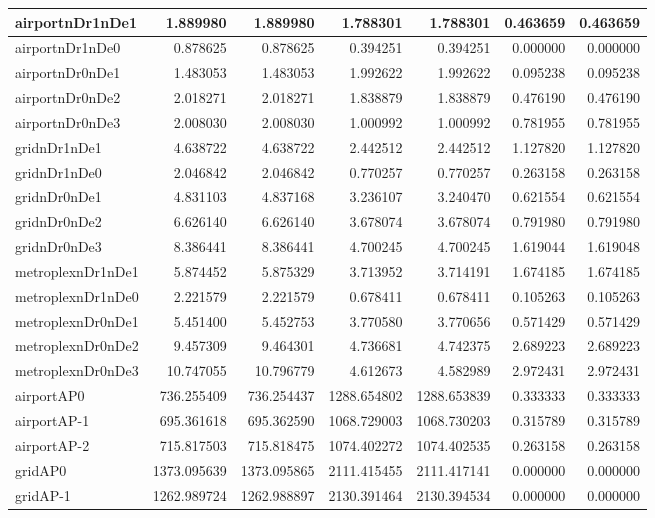 \begin{longtable}{|l|r|r|r|r|r|r|}
\endlastfoot
airportnDr1nDe1 & 1.889980 & 1.889980 & 1.788301 & 1.788301 & 0.463659 & 0.463659 \\ \hline
airportnDr1nDe0 & 0.878625 & 0.878625 & 0.394251 & 0.394251 & 0.000000 & 0.000000 \\ \hline
airportnDr0nDe1 & 1.483053 & 1.483053 & 1.992622 & 1.992622 & 0.095238 & 0.095238 \\ \hline
airportnDr0nDe2 & 2.018271 & 2.018271 & 1.838879 & 1.838879 & 0.476190 & 0.476190 \\ \hline
airportnDr0nDe3 & 2.008030 & 2.008030 & 1.000992 & 1.000992 & 0.781955 & 0.781955 \\ \hline
gridnDr1nDe1 & 4.638722 & 4.638722 & 2.442512 & 2.442512 & 1.127820 & 1.127820 \\ \hline
gridnDr1nDe0 & 2.046842 & 2.046842 & 0.770257 & 0.770257 & 0.263158 & 0.263158 \\ \hline
gridnDr0nDe1 & 4.831103 & 4.837168 & 3.236107 & 3.240470 & 0.621554 & 0.621554 \\ \hline
gridnDr0nDe2 & 6.626140 & 6.626140 & 3.678074 & 3.678074 & 0.791980 & 0.791980 \\ \hline
gridnDr0nDe3 & 8.386441 & 8.386441 & 4.700245 & 4.700245 & 1.619044 & 1.619048 \\ \hline
metroplexnDr1nDe1 & 5.874452 & 5.875329 & 3.713952 & 3.714191 & 1.674185 & 1.674185 \\ \hline
metroplexnDr1nDe0 & 2.221579 & 2.221579 & 0.678411 & 0.678411 & 0.105263 & 0.105263 \\ \hline
metroplexnDr0nDe1 & 5.451400 & 5.452753 & 3.770580 & 3.770656 & 0.571429 & 0.571429 \\ \hline
metroplexnDr0nDe2 & 9.457309 & 9.464301 & 4.736681 & 4.742375 & 2.689223 & 2.689223 \\ \hline
metroplexnDr0nDe3 & 10.747055 & 10.796779 & 4.612673 & 4.582989 & 2.972431 & 2.972431 \\ \hline
airportAP0 & 736.255409 & 736.254437 & 1288.654802 & 1288.653839 & 0.333333 & 0.333333 \\ \hline
airportAP-1 & 695.361618 & 695.362590 & 1068.729003 & 1068.730203 & 0.315789 & 0.315789 \\ \hline
airportAP-2 & 715.817503 & 715.818475 & 1074.402272 & 1074.402535 & 0.263158 & 0.263158 \\ \hline
gridAP0 & 1373.095639 & 1373.095865 & 2111.415455 & 2111.417141 & 0.000000 & 0.000000 \\ \hline
gridAP-1 & 1262.989724 & 1262.988897 & 2130.391464 & 2130.394534 & 0.000000 & 0.000000 \\ \hline

\end{longtable}
